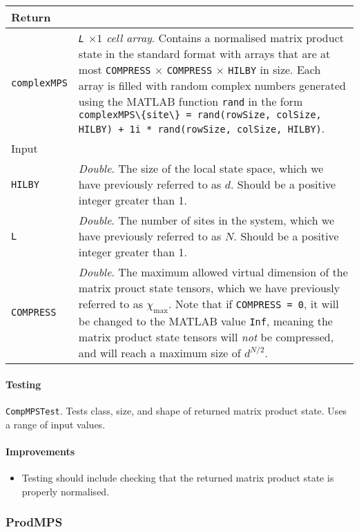  \begin{longtabu}{X[1,l]X[4,l]}
 \hline
 Return & \\ \hline
 \lstinline$complexMPS$ & \emph{\lstinline$L$ \(\times 1\) cell array}. Contains a normalised matrix product state in the standard format with arrays that are at most \lstinline$COMPRESS$ \(\times\) \lstinline$COMPRESS$ \(\times\) \lstinline$HILBY$ in size. Each array is filled with random complex numbers generated using the MATLAB function \lstinline$rand$ in the form \lstinline$complexMPS\{site\} = rand(rowSize, colSize, HILBY) + 1i * rand(rowSize, colSize, HILBY)$. \\ \hline
 Input & \\ \hline
 \lstinline$HILBY$ & \emph{Double}. The size of the local state space, which we have previously referred to as \(d\). Should be a positive integer greater than 1.  \\
 \lstinline$L$ & \emph{Double}. The number of sites in the system, which we have previously referred to as \(N\). Should be a positive integer greater than 1. \\
 \lstinline$COMPRESS$ & \emph{Double}. The maximum allowed virtual dimension of the matrix prouct state tensors, which we have previously referred to as \(\chi_{\mathrm{max}}\). Note that if \lstinline$COMPRESS = 0$, it will be changed to the MATLAB value \lstinline$Inf$, meaning the matrix product state tensors will \emph{not} be compressed, and will reach a maximum size of \(d^{N/2}\).  \\
 \hline
 \end{longtabu}
 \paragraph{Testing}
 \lstinline$CompMPSTest$. Tests class, size, and shape of returned matrix product state. Uses a range of input values.
 \paragraph{Improvements}
 \begin{itemize}
 \item Testing should include checking that the returned matrix product state is properly normalised.
 \end{itemize}
 
 \subsubsection{ProdMPS}
